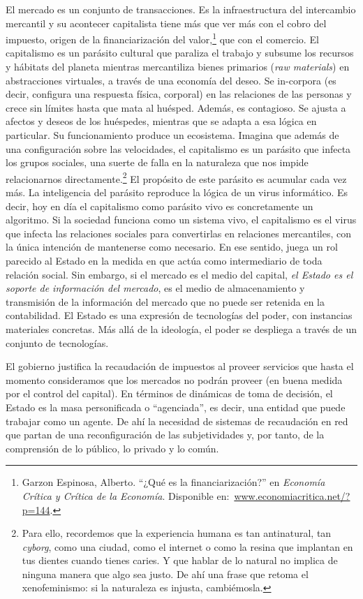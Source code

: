 El mercado es un conjunto de transacciones. Es la infraestructura del intercambio mercantil y su acontecer capitalista tiene más que ver más con el cobro del impuesto, origen de la financiarización del valor,\footnote{Garzon Espinosa, Alberto. \enquote{¿Qué es la financiarización?} en \emph{Economía Crítica y Crítica de la Economía}. Disponible en:~\url{www.economiacritica.net/?p=144}.} que con el comercio. El capitalismo es un parásito cultural que paraliza el trabajo y subsume los recursos y hábitats del planeta mientras mercantiliza bienes primarios (\emph{raw materials}) en abstracciones virtuales, a través de una economía del deseo. Se in-corpora (es decir, configura una respuesta física, corporal) en las relaciones de las personas y crece sin límites hasta que mata al huésped. Además, es contagioso. Se ajusta a afectos y deseos de los huéspedes, mientras que se adapta a esa lógica en particular. Su funcionamiento produce un ecosistema. Imagina que además de una configuración sobre las velocidades, el capitalismo es un parásito que infecta los grupos sociales, una suerte de falla en la naturaleza que nos impide relacionarnos directamente.\footnote{Para ello, recordemos que la experiencia humana es tan antinatural, tan \emph{cyborg}, como una ciudad, como el internet o como la resina que implantan en tus dientes cuando tienes caries. Y que hablar de lo natural no implica de ninguna manera que algo sea justo. De ahí una frase que retoma el xenofeminismo: si la naturaleza es injusta, cambiémosla.} El propósito de este parásito es acumular cada vez más. La inteligencia del parásito reproduce la lógica de un virus informático. Es decir, hoy en día el capitalismo como parásito vivo es concretamente un algoritmo. Si la sociedad funciona como un sistema vivo, el capitalismo es el virus que infecta las relaciones sociales para convertirlas en relaciones mercantiles, con la única intención de mantenerse como necesario. En ese sentido, juega un rol parecido al Estado en la medida en que actúa como intermediario de toda relación social. Sin embargo, si el mercado es el medio del capital, \emph{el Estado es el soporte de información del mercado}, es el medio de almacenamiento y transmisión de la información del mercado que no puede ser retenida en la contabilidad. El Estado es una expresión de tecnologías del poder, con instancias materiales concretas. Más allá de la ideología, el poder se despliega a través de un conjunto de tecnologías.

El gobierno justifica la recaudación de impuestos al proveer servicios que hasta el momento consideramos que los mercados no podrán proveer (en buena medida por el control del capital). En términos de dinámicas de toma de decisión, el Estado es la masa personificada o \enquote{agenciada}, es decir, una entidad que puede trabajar como un agente. De ahí la necesidad de sistemas de recaudación en red que partan de una reconfiguración de las subjetividades y, por tanto, de la comprensión de lo público, lo privado y lo común.

